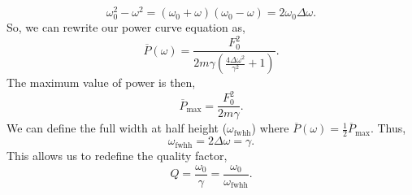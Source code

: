 \documentclass{book}
\begin{document}
\begin{equation}
    \omega_0^2 - \omega^2 = (\omega_0 + \omega)(\omega_0 - \omega) = 2\omega_0\Delta\omega.
\end{equation}
So, we can rewrite our power curve equation as,
\begin{equation}
    \overline{P}(\omega) = \frac{F_0^2}{2m\gamma\left(\frac{4\Delta \omega^2}{\gamma^2} + 1\right)}.
\end{equation}
The maximum value of power is then,
\begin{equation}
    \overline{P}_{\text{max}} = \frac{F_0^2}{2m\gamma}.
\end{equation}
We can define the full width at half height ($\omega_{\text{fwhh}}$) where $\overline{P}(\omega) = \frac{1}{2}\overline{P}_{\text{max}}$. Thus,
\begin{equation}
    \omega_{\text{fwhh}} = 2\Delta \omega = \gamma.
\end{equation}
This allows us to redefine the quality factor,
\begin{equation}
    Q = \frac{\omega_0}{\gamma} = \frac{\omega_0}{\omega_{\text{fwhh}}}.
\end{equation}
\end{document}
